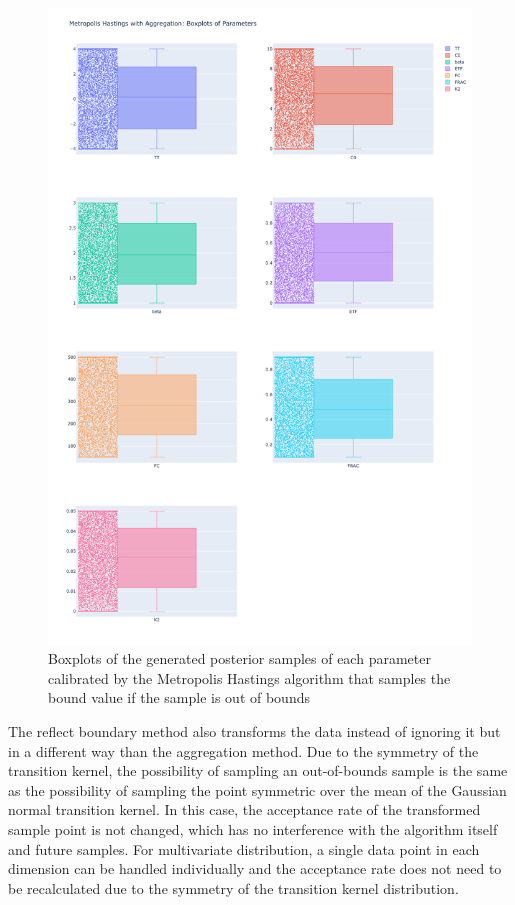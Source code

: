 \begin{figure}
    \centering
    \includegraphics[width=1\textwidth]{figures/basic_mh/aggr_mh/aggr_mh_boxplot.png}
    \captionsetup{width=.8\textwidth}
    \caption{Boxplots of the generated posterior samples of each parameter
calibrated by the Metropolis Hastings algorithm that samples the bound value if the sample is out of bounds}
    \label{fig:enter-label}
\end{figure}



The reflect boundary method also transforms the data instead of ignoring it but in a different way than the aggregation method. Due to the symmetry of the transition kernel, the possibility of sampling an out-of-bounds sample is the same as the possibility of sampling the point symmetric over the mean of the Gaussian normal transition kernel.\cite{gaussian_distribution_property} In this case, the acceptance rate of the transformed sample point is not changed, which has no interference with the algorithm itself and future samples. For multivariate distribution, a single data point in each dimension can be handled individually and the acceptance rate does not need to be recalculated due to the symmetry of the transition kernel distribution. 

